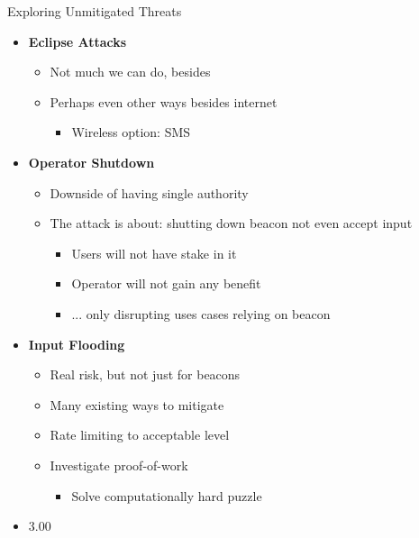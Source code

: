 \begin{frame}{Exploring Unmitigated Threats}
{\begin{multicols}{2}
\begin{itemize}
            \item \textbf{Eclipse Attacks}
            \begin{itemize}
                \item Not much we can do, besides
                \item Perhaps even other ways besides internet
                \begin{itemize}
                    \item Wireless option: SMS
                \end{itemize}
            \end{itemize}

            \item \textbf{Operator Shutdown}
            \begin{itemize}
                \item Downside of having single authority
                \item The attack is about: shutting down beacon \textrightarrow{} not even accept input
                \begin{itemize}
                    \item Users will not have stake in it
                    \item Operator will not gain any benefit
                    \item ... only disrupting uses cases relying on beacon
                \end{itemize}
            \end{itemize}

            \item \textbf{Input Flooding}
            \begin{itemize}
                \item Real risk, but not just for beacons
                \item Many existing ways to mitigate
                \item Rate limiting to acceptable level
                \item Investigate proof-of-work
                \begin{itemize}
                    \item Solve computationally hard puzzle
                \end{itemize}
            \end{itemize}
            \item 3.00
        \end{itemize}
    \end{multicols}
}\end{frame}



